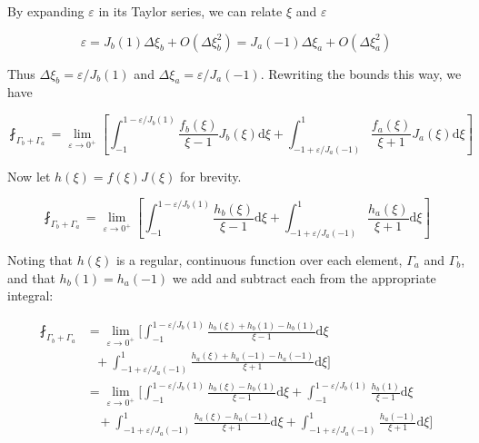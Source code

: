 By expanding $\varepsilon$ in its Taylor series, we can relate $\xi$ and $\varepsilon$

\begin{equation}
\varepsilon = J_b(1) \Delta \xi_b + O(\Delta \xi_b^2) = J_a(-1) \Delta \xi_a + O(\Delta \xi_a^2)
\end{equation}

Thus $\Delta \xi_b = \varepsilon/J_b(1)$ and $\Delta \xi_a = \varepsilon/J_a(-1)$. Rewriting the bounds this way, we have 

\begin{equation}
\fint_{\Gamma_b + \Gamma_a} = \lim_{ \varepsilon \rightarrow 0^+} \left[ \int_{-1}^{1 -\varepsilon/J_b(1)} \frac{f_b(\xi)}{\xi-1} J_b(\xi) \mathrm{d}\xi + \int_{-1 + \varepsilon/J_a(-1)}^{1} \frac{f_a(\xi)}{\xi+1} J_a(\xi) \mathrm{d}\xi \right]
\end{equation}

Now let $h(\xi) = f(\xi)J(\xi)$ for brevity. 

\begin{equation}
\fint_{\Gamma_b + \Gamma_a} = \lim_{ \varepsilon \rightarrow 0^+} \left[ \int_{-1}^{1 -\varepsilon/J_b(1)} \frac{h_b(\xi)}{\xi-1} \mathrm{d}\xi + \int_{-1 + \varepsilon/J_a(-1)}^{1} \frac{h_a(\xi)}{\xi+1} \mathrm{d}\xi \right]
\end{equation}

Noting that $h(\xi)$ is a regular, continuous function over each element, $\Gamma_a$ and $\Gamma_b$, and that $h_b(1) = h_a(-1)$ we add and subtract each from the appropriate integral:

\[
\begin{aligned}
\fint_{\Gamma_b + \Gamma_a} &= 
\lim_{ \varepsilon \rightarrow 0^+} 
\biggl[ 
\int_{-1}^{1 -\varepsilon/J_b(1)} \frac{h_b(\xi)+h_b(1)-h_b(1)}{\xi-1} \mathrm{d}\xi \\
&~~~ +\int_{-1 + \varepsilon/J_a(-1)}^{1} \frac{h_a(\xi)+h_a(-1)-h_a(-1)}{\xi+1} \mathrm{d}\xi 
\biggr] \\
&= 
\lim_{ \varepsilon \rightarrow 0^+} 
\biggl[
\int_{-1}^{1 -\varepsilon/J_b(1)} \frac{h_b(\xi)-h_b(1)}{\xi-1} \mathrm{d}\xi + \int_{-1}^{1 -\varepsilon/J_b(1)} \frac{h_b(1)}{\xi-1} \mathrm{d}\xi\\
&~~~~+
\int_{-1 + \varepsilon/J_a(-1)}^{1} \frac{h_a(\xi)-h_a(-1)}{\xi+1} \mathrm{d}\xi + \int_{-1 + \varepsilon/J_a(-1)}^{1} \frac{h_a(-1)}{\xi+1} \mathrm{d}\xi
\biggr]
\end{aligned}
\]


